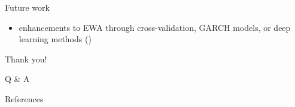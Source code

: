 \documentclass[dvipsnames,mathserif]{beamer}
\begin{document}
\begin{frame}{\large Future work}
\begin{itemize}
     \item enhancements to EWA through cross-validation, GARCH models, or deep learning methods (\cite{TanZohren})
\end{itemize}

\vfill 
\end{frame}






    

 

  



 

\begin{frame}[noframenumbering]
\centering
\Large
Thank you!

\vspace{.5cm}
\Large
Q \& A
\end{frame}

\begin{frame}{References}
    \printbibliography
\end{frame}

\end{document}
